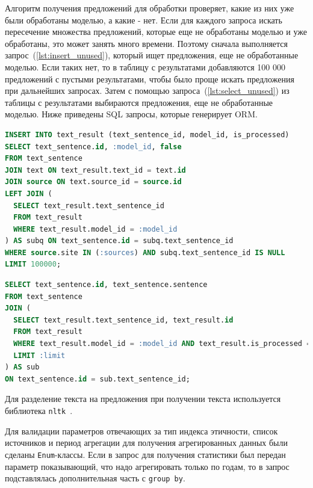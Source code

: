 \documentclass{article}
\begin{document}
Алгоритм получения предложений для обработки проверяет, какие из них уже были обработаны моделью, а какие - нет. Если для каждого запроса искать пересечение множества предложений, которые еще не обработаны моделью и уже обработаны, это может занять много времени. Поэтому сначала выполняется запрос~(\ref{lst:insert_unused}), который ищет предложения, еще не обработанные моделью. Если таких нет, то в таблицу с результатами добавляются 100 000 предложений с пустыми результатами, чтобы было проще искать предложения при дальнейших запросах. Затем с помощью запроса~(\ref{lst:select_unused}) из таблицы с результатами выбираются предложения, еще не обработанные моделью. Ниже приведены SQL запросы, которые генерирует ORM.

\begin{lstlisting}[language=SQL,label=lst:insert_unused,caption={SQL запрос на вставку не обработанных предложений},captionpos=b,numbers=none]
INSERT INTO text_result (text_sentence_id, model_id, is_processed)
SELECT text_sentence.id, :model_id, false
FROM text_sentence
JOIN text ON text_result.text_id = text.id
JOIN source ON text.source_id = source.id
LEFT JOIN (
  SELECT text_result.text_sentence_id
  FROM text_result
  WHERE text_result.model_id = :model_id
) AS subq ON text_sentence.id = subq.text_sentence_id
WHERE source.site IN (:sources) AND subq.text_sentence_id IS NULL
LIMIT 100000;
\end{lstlisting}

\begin{lstlisting}[language=SQL,label=lst:select_unused,caption={SQL запрос на получение еще не обработанных предложений},captionpos=b,numbers=none]
SELECT text_sentence.id, text_sentence.sentence
FROM text_sentence
JOIN (
  SELECT text_result.text_sentence_id, text_result.id
  FROM text_result
  WHERE text_result.model_id = :model_id AND text_result.is_processed = false
  LIMIT :limit
) AS sub
ON text_sentence.id = sub.text_sentence_id;
\end{lstlisting}

Для разделение текста на предложения при получении текста используется библиотека \texttt{nltk}~\autocite{bird_natural_2009}.

Для валидации параметров отвечающих за тип индекса этичности, список источников и период агрегации для получения агрегированных данных были сделаны \texttt{Enum}-классы. Если в запрос для получения статистики был передан параметр показывающий, что надо агрегировать только по годам, то в запрос подставлялась дополнительная часть с \texttt{group by}.
\end{document}
